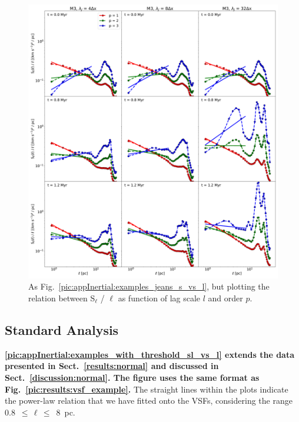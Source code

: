  	
\begin{figure}
    \centering
    \includegraphics[width=\textwidth]{app_examples_jeans_sl_l.pdf}
    \caption{
        As Fig.~\ref{pic:appInertial:examples_jeans_s_vs_l}, but plotting the relation between S$_{\ell}$ / $\ell$ as function of lag scale $l$ and order $p$.
    }
    \label{pic:appInertial:examples_jeans_sl_vs_l}
\end{figure}

\subsection{Standard Analysis}\label{Bsub:standard}

\textbf{
\ref{pic:appInertial:examples_with_threshold_sl_vs_l} extends the data presented in Sect.~\ref{results:normal} and discussed in Sect.~\ref{discussion:normal}.
The figure uses the same format as Fig.~\ref{pic:results:vsf_example}.
}
The straight lines within the plots indicate the power-law relation that we have fitted onto the VSFs, considering the range 0.8~$\leq\,\ell\,\leq$~8~pc.


